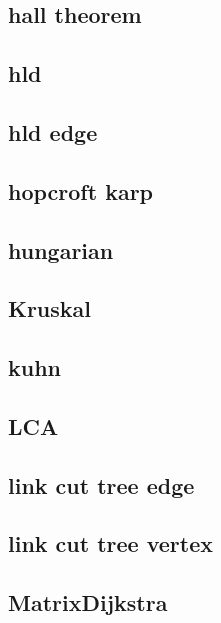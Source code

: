 \subsection{hall theorem}
\raggedbottom
\hrulefill
\subsection{hld}
\raggedbottom
\hrulefill
\subsection{hld edge}
\raggedbottom
\hrulefill
\subsection{hopcroft karp}
\raggedbottom
\hrulefill
\subsection{hungarian}
\raggedbottom
\hrulefill
\subsection{Kruskal}
\raggedbottom
\hrulefill
\subsection{kuhn}
\raggedbottom
\hrulefill
\subsection{LCA}
\raggedbottom
\hrulefill
\subsection{link cut tree edge}
\raggedbottom
\hrulefill
\subsection{link cut tree vertex}
\raggedbottom
\hrulefill
\subsection{MatrixDijkstra}
\raggedbottom
\hrulefill
